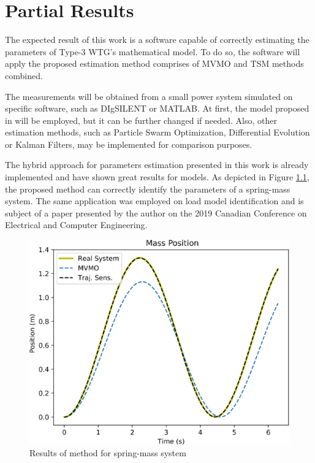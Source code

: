 \chapter{Partial Results}

\label{ch: Res}

The expected result of this work is a software capable of correctly estimating the parameters of Type-3 WTG's mathematical model. To do so, the software will apply the proposed estimation method comprises of MVMO and TSM methods combined. 

The measurements will be obtained from a small power system simulated on specific software, such as DIgSILENT or MATLAB. At first, the model proposed in \cite{Erlich2012} will be employed, but it can be further changed if needed. Also, other estimation methods, such as Particle Swarm Optimization, Differential Evolution or Kalman Filters, may be implemented for comparison purposes.

The hybrid approach for parameters estimation presented in this work is already implemented and have shown great results for models. As depicted in Figure \ref{fig: spring-mass}, the proposed method can correctly identify the parameters of a spring-mass system. The same application was employed on load model identification and is subject of a paper presented by the author on the 2019 Canadian Conference on Electrical and Computer Engineering.

\begin{figure}[h]
	\caption{Results of method for spring-mass system}
	\begin{center}
		\includegraphics[scale=0.5]{Images/SpringMass.eps}
	\end{center}
	\label{fig: spring-mass}
\end{figure}


